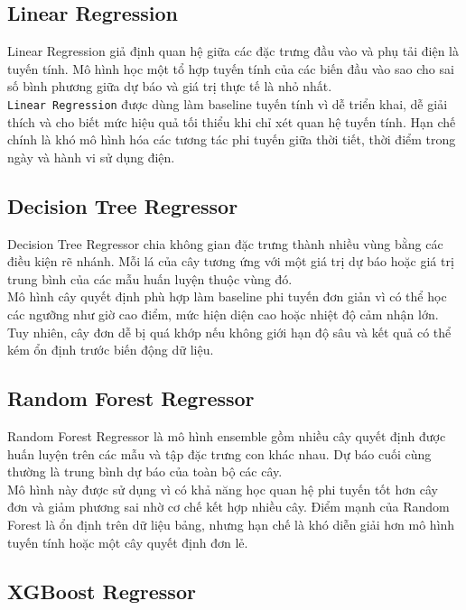 \subsection{Linear Regression}

Linear Regression giả định quan hệ giữa các đặc trưng đầu vào và phụ tải điện là tuyến tính. Mô hình học một tổ hợp tuyến tính của các biến đầu vào sao cho sai số bình phương giữa dự báo và giá trị thực tế là nhỏ nhất.
\\
\texttt{Linear Regression} được dùng làm baseline tuyến tính vì dễ triển khai, dễ giải thích và cho biết mức hiệu quả tối thiểu khi chỉ xét quan hệ tuyến tính. Hạn chế chính là khó mô hình hóa các tương tác phi tuyến giữa thời tiết, thời điểm trong ngày và hành vi sử dụng điện.

\subsection{Decision Tree Regressor}

Decision Tree Regressor chia không gian đặc trưng thành nhiều vùng bằng các điều kiện rẽ nhánh. Mỗi lá của cây tương ứng với một giá trị dự báo hoặc giá trị trung bình của các mẫu huấn luyện thuộc vùng đó.
\\
Mô hình cây quyết định phù hợp làm baseline phi tuyến đơn giản vì có thể học các ngưỡng như giờ cao điểm, mức hiện diện cao hoặc nhiệt độ cảm nhận lớn. Tuy nhiên, cây đơn dễ bị quá khớp nếu không giới hạn độ sâu và kết quả có thể kém ổn định trước biến động dữ liệu.

\subsection{Random Forest Regressor}

Random Forest Regressor là mô hình ensemble gồm nhiều cây quyết định được huấn luyện trên các mẫu và tập đặc trưng con khác nhau. Dự báo cuối cùng thường là trung bình dự báo của toàn bộ các cây.
\\
Mô hình này được sử dụng vì có khả năng học quan hệ phi tuyến tốt hơn cây đơn và giảm phương sai nhờ cơ chế kết hợp nhiều cây. Điểm mạnh của Random Forest là ổn định trên dữ liệu bảng, nhưng hạn chế là khó diễn giải hơn mô hình tuyến tính hoặc một cây quyết định đơn lẻ.

\subsection{XGBoost Regressor}

